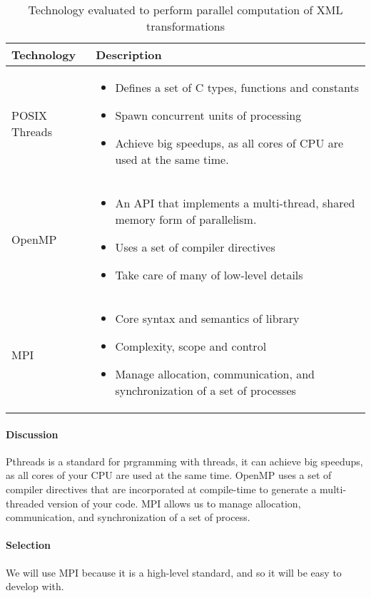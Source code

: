 \begin{table}[H]
  \begin{center}
    \begin{tabular}{ | l | p{10cm} | }
      \hline
      Technology & Description  \\ \hline

      POSIX Threads \cite{posix-threads} &
      \begin{itemize}
        \item Defines a set of C types, functions and constants 
        \item Spawn concurrent units of processing
        \item Achieve big speedups, as all cores of CPU are used at the same time.
        \end{itemize}\\ \hline

      OpenMP \cite{Openmp} &
      \begin{itemize}
        \item An API that implements a multi-thread, shared memory form of parallelism.
        \item Uses a set of compiler directives 
        \item Take care of many of low-level details
      \end{itemize}\\ \hline

      MPI \cite{mpi} &
      \begin{itemize}
        \item Core syntax and semantics of library
        \item Complexity, scope and control
        \item Manage allocation, communication, and synchronization of a set of processes 
      \end{itemize}\\ \hline
    \end{tabular}
  \end{center}
  \caption{Technology evaluated to perform parallel computation of XML transformations}
\end{table}

\paragraph{Discussion}

Pthreads is a standard for prgramming with threads, it can achieve big speedups, as all cores of your CPU are used at the same time.
OpenMP uses a set of compiler directives that are incorporated at compile-time to generate a multi-threaded version of your code.
MPI allows us to manage allocation, communication, and synchronization of a set of process.

\paragraph{Selection}

We will use MPI because it is a high-level standard, and so it will be easy to develop with.
